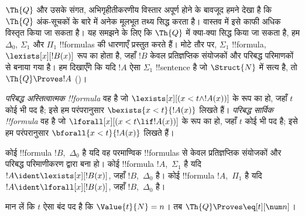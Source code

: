 \documentclass[../../../include/open-logic-section]{subfiles}
\begin{document}

$\Th{Q}$ और उसके संगत, अभिगृहीतीकरणीय विस्तार अपूर्ण होने के बावजूद हमने
देखा है कि $\Th{Q}$ अंक-सूचकों के बारे में अनेक मूलभूत तथ्य सिद्ध करता है।
वास्तव में इसे काफी अधिक विस्तृत किया जा सकता है। यह समझने के लिए कि
$\Th{Q}$ में क्या-क्या सिद्ध किया जा सकता है, हम $\Delta_0$, $\Sigma_1$
और $\Pi_1$ !!{formula}s की धारणाएँ प्रस्तुत करते हैं। मोटे तौर पर,
$\Sigma_1$ !!{formula},~$\lexists[x][!B(x)]$ रूप का होता है, जहाँ $!B$ केवल
प्रतिज्ञप्तिक संयोजकों और परिबद्ध परिमाणकों से बनाया गया है। हम दिखाएँगे कि
यदि $!A$ ऐसा $\Sigma_1$ !!{sentence} है जो $\Struct{N}$ में सत्य है, तो
$\Th{Q} \Proves !A$ ()।

\begin{defn}
\emph{परिबद्ध अस्तित्वात्मक !!{formula}} वह है जो
$\lexists[x][(x < t \land !A(x))]$ के रूप का हो, जहाँ $t$ कोई भी पद है;
इसे हम परंपरानुसार $\bexists{x < t}{!A(x)}$ लिखते हैं।
%
\emph{परिबद्ध सार्विक !!{formula}} वह है जो
$\lforall[x][(x < t \lif !A(x))]$ के रूप का हो, जहाँ $t$ कोई भी पद है;
इसे हम परंपरानुसार $\bforall{x < t}{!A(x)}$ लिखते हैं।
\end{defn}

\begin{defn}
कोई !!{formula} $!B$,~$\Delta_0$ है यदि वह परमाण्विक !!{formula}s से केवल
प्रतिज्ञप्तिक संयोजकों और परिबद्ध परिमाणीकरण द्वारा बना हो।
%
कोई !!{formula} $!A$,~$\Sigma_1$ है यदि
$!A \ident \lexists[x][!B(x)]$, जहाँ $!B$,~$\Delta_0$ है।
%
कोई !!{formula} $!A$,~$\Pi_1$ है यदि
$!A \ident \lforall[x][!B(x)]$, जहाँ $!B$,~$\Delta_0$ है।
\end{defn}

\begin{lem}
 मान लें कि $t$ ऐसा बंद पद है कि
$\Value{t}{N} = n$। तब $\Th{Q} \Proves \eq[t][\num n]$।
\end{lem}
\end{document}
